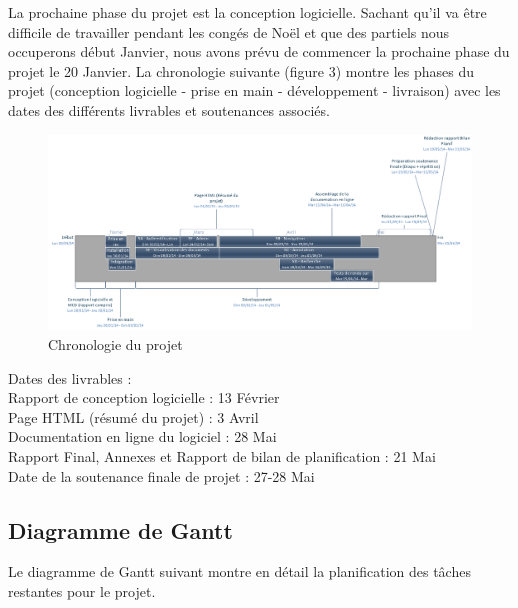 \documentclass[a4paper]{article}
\begin{document}
	La prochaine phase du projet est la conception logicielle. Sachant qu'il va être difficile de travailler pendant les congés de Noël et que des partiels nous occuperons début Janvier, nous avons prévu de commencer la prochaine phase du projet le 20 Janvier. La chronologie suivante (figure 3) montre les phases du projet (conception logicielle - prise en main - développement - livraison) avec les dates des différents livrables et soutenances associés. 
	
\begin{figure}[H]
\centering
\includegraphics[width=\textwidth]{chronologie.png}
\caption{Chronologie du projet}
\label{fig:chronologie}
\end{figure}

	Dates des livrables : \\
		Rapport de conception logicielle : 13 Février\\
		Page HTML (résumé du projet) : 3 Avril\\
		Documentation en ligne du logiciel : 28 Mai\\
		Rapport Final, Annexes et Rapport de bilan de planification : 21 Mai\\
				
	Date de la soutenance finale de projet : 27-28 Mai\\

\subsection{Diagramme de Gantt}

	Le diagramme de Gantt suivant montre en détail la planification des tâches restantes pour le projet.
\end{document}
